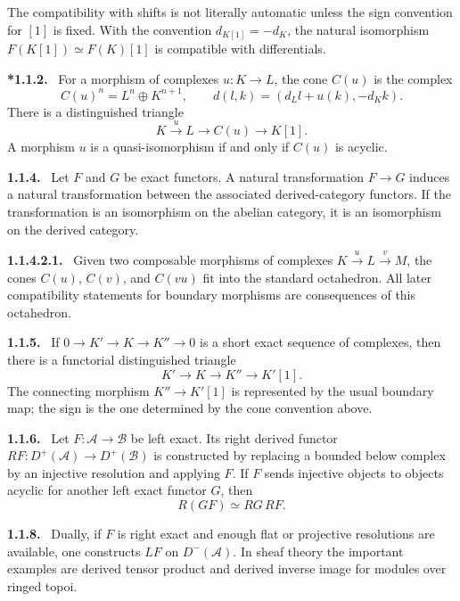 \documentclass[12pt]{article}
\newcommand{\A}{\mathcal{A}}
\newcommand{\B}{\mathcal{B}}
\newenvironment{statement}[1]{\par\medskip\noindent\textbf{#1.}\ }{\par\medskip}
\begin{document}
The compatibility with shifts is not literally automatic unless the sign convention for \([1]\) is fixed. With the convention \(d_{K[1]}=-d_K\), the natural isomorphism \(F(K[1])\simeq F(K)[1]\) is compatible with differentials.

\begin{statement}{*1.1.2}
For a morphism of complexes \(u:K\to L\), the cone \(C(u)\) is the complex
\[
C(u)^n=L^n\oplus K^{n+1},
\qquad
 d(l,k)=(d_Ll+u(k),-d_Kk).
\]
There is a distinguished triangle
\[
K\xrightarrow{u}L\to C(u)\to K[1].
\]
A morphism \(u\) is a quasi-isomorphism if and only if \(C(u)\) is acyclic.
\end{statement}

\begin{statement}{1.1.4}
Let \(F\) and \(G\) be exact functors. A natural transformation \(F\to G\) induces a natural transformation between the associated derived-category functors. If the transformation is an isomorphism on the abelian category, it is an isomorphism on the derived category.
\end{statement}

\begin{statement}{1.1.4.2.1}
Given two composable morphisms of complexes \(K\xrightarrow{u}L\xrightarrow{v}M\), the cones \(C(u)\), \(C(v)\), and \(C(vu)\) fit into the standard octahedron. All later compatibility statements for boundary morphisms are consequences of this octahedron.
\end{statement}

\begin{statement}{1.1.5}
If \(0\to K'\to K\to K''\to0\) is a short exact sequence of complexes, then there is a functorial distinguished triangle
\[
K'\to K\to K''\to K'[1].
\]
The connecting morphism \(K''\to K'[1]\) is represented by the usual boundary map; the sign is the one determined by the cone convention above.
\end{statement}

\begin{statement}{1.1.6}
Let \(F:\A\to\B\) be left exact. Its right derived functor \(RF:D^+(\A)\to D^+(\B)\) is constructed by replacing a bounded below complex by an injective resolution and applying \(F\). If \(F\) sends injective objects to objects acyclic for another left exact functor \(G\), then
\[
R(GF)\simeq RG\,RF.
\]
\end{statement}

\begin{statement}{1.1.8}
Dually, if \(F\) is right exact and enough flat or projective resolutions are available, one constructs \(LF\) on \(D^-(\A)\). In sheaf theory the important examples are derived tensor product and derived inverse image for modules over ringed topoi.
\end{statement}
\end{document}
